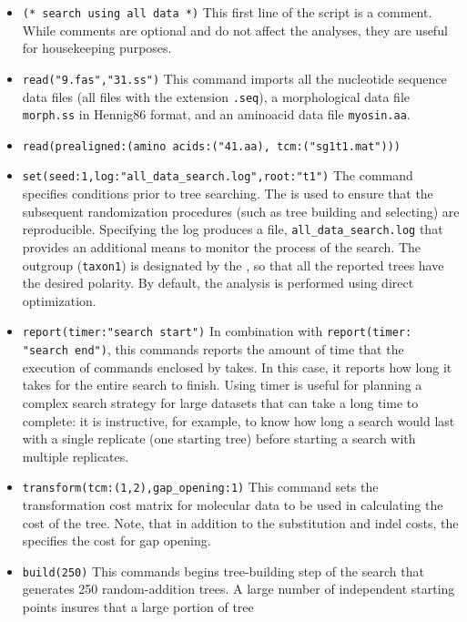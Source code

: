 \begin{itemize}
\item \texttt{(* search using all data *)} This first line of the script is a comment. While comments are optional 
and do not affect the analyses, they are useful for housekeeping purposes.
\item \texttt{read("9.fas","31.ss")} This command imports all the nucleotide sequence data files (all files with the extension \texttt{.seq}), a 
morphological data file \texttt{morph.ss} in Hennig86 format, and an aminoacid data file \texttt{myosin.aa}.
\item \texttt{read(prealigned:(amino acids:("41.aa), tcm:("sg1t1.mat")))}
\item \texttt{set(seed:1,log:"all\_data\_search.log",root:"t1")} The  command specifies 
conditions prior to tree searching. The  is used to ensure that the subsequent 
randomization procedures (such as tree building and selecting) are reproducible. Specifying the log 
produces a file, \texttt{all\_data\_search.log} that provides an additional means to monitor the process 
of the search. The outgroup (\texttt{taxon1}) is designated by the , so that all the 
reported trees have the desired polarity. By default, the analysis is performed using direct optimization.
\item \texttt{report(timer:"search start")} In combination with \texttt{report(timer:\\"search end")}, this commands 
reports the amount of time that the execution of commands enclosed by  takes. In this 
case, it reports how long it takes for the entire search to finish. Using timer is useful for planning a complex 
search strategy for large datasets that can take a long time to complete: it is instructive, for example, to know 
how 
long a search would last with a single replicate (one starting tree) before starting a search with multiple 
replicates.
\item \texttt{transform(tcm:(1,2),gap\_opening:1)} This command sets the \\transformation cost matrix for 
molecular data to be used in calculating the cost of the tree. Note, that in addition to the substitution and 
indel costs, the  specifies the cost for gap opening.
\item \texttt{build(250)} This commands begins tree-building step of the search that generates 250 
random-addition trees. A large number of independent starting points insures that a large portion of tree 

\end{itemize}
